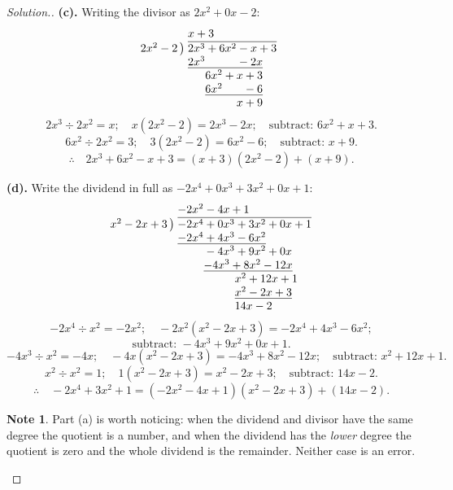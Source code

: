 \documentclass[11pt,a4paper]{article}
\theoremstyle{definition}
\newtheorem{note}[thm]{Note}
\newenvironment{solution}
  {\renewcommand{\qedsymbol}{}\begin{proof}[\textit{Solution}.]}
  {\end{proof}}
\begin{document}
\begin{solution}
\textbf{(c).} Writing the divisor as $2x^2+0x-2$:
$$\begin{array}{r@{\;}l}
 & x+3\\
2x^{2}-2\,\big) & \overline{2x^{3}+6x^{2}-x+3}\\
 & \underline{2x^{3}\phantom{{}+6x^{2}}-2x}\phantom{{}+3}\\
 & \phantom{2x^{3}}6x^{2}+x+3\\
 & \phantom{2x^{3}}\underline{6x^{2}\phantom{{}+x}-6}\\
 & \phantom{2x^{3}+6x^{2}}x+9
\end{array}$$
$$2x^3\div 2x^2=x;\quad x\left(2x^2-2\right)=2x^3-2x;\quad
\text{subtract: } 6x^2+x+3.$$
$$6x^2\div 2x^2=3;\quad 3\left(2x^2-2\right)=6x^2-6;\quad \text{subtract: } x+9.$$
$$\therefore\quad 2x^3+6x^2-x+3=(x+3)\left(2x^2-2\right)+(x+9).$$

\textbf{(d).} Write the dividend in full as $-2x^4+0x^3+3x^2+0x+1$:
$$\begin{array}{r@{\;}l}
 & -2x^{2}-4x+1\\
x^{2}-2x+3\,\big) & \overline{-2x^{4}+0x^{3}+3x^{2}+0x+1}\\
 & \underline{-2x^{4}+4x^{3}-6x^{2}}\phantom{{}+0x+1}\\
 & \phantom{-2x^{4}}-4x^{3}+9x^{2}+0x\phantom{{}+1}\\
 & \phantom{-2x^{4}}\underline{-4x^{3}+8x^{2}-12x}\phantom{{}+1}\\
 & \phantom{-2x^{4}-4x^{3}}x^{2}+12x+1\\
 & \phantom{-2x^{4}-4x^{3}}\underline{x^{2}-2x+3}\\
 & \phantom{-2x^{4}-4x^{3}}14x-2
\end{array}$$
$$-2x^4\div x^2=-2x^2;\quad -2x^2\left(x^2-2x+3\right)=-2x^4+4x^3-6x^2;$$
$$\text{subtract: } -4x^3+9x^2+0x+1.$$
$$-4x^3\div x^2=-4x;\quad -4x\left(x^2-2x+3\right)=-4x^3+8x^2-12x;\quad
\text{subtract: } x^2+12x+1.$$
$$x^2\div x^2=1;\quad 1\left(x^2-2x+3\right)=x^2-2x+3;\quad
\text{subtract: } 14x-2.$$
$$\therefore\quad -2x^4+3x^2+1=\left(-2x^2-4x+1\right)\left(x^2-2x+3\right)+(14x-2).$$

\begin{note}
Part (a) is worth noticing: when the dividend and divisor have the same degree the
quotient is a number, and when the dividend has the \emph{lower} degree the quotient is
zero and the whole dividend is the remainder. Neither case is an error.
\end{note}
\end{solution}
\end{document}
